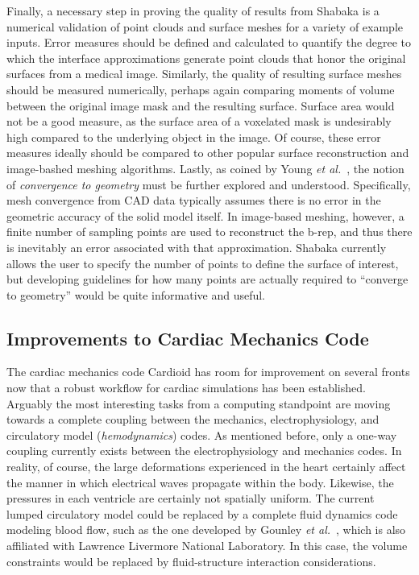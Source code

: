 Finally, a necessary step in proving the quality of results from Shabaka is a numerical validation of point clouds and surface meshes for a variety of example inputs. Error measures should be defined and calculated to quantify the degree to which the interface approximations generate point clouds that honor the original surfaces from a medical image. Similarly, the quality of resulting surface meshes should be measured numerically, perhaps again comparing moments of volume between the original image mask and the resulting surface. Surface area would not be a good measure, as the surface area of a voxelated mask is undesirably high compared to the underlying object in the image. Of course, these error measures ideally should be compared to other popular surface reconstruction and image-bashed meshing algorithms. Lastly, as coined by Young \textit{et al.}~\cite{young_2008}, the notion of \textit{convergence to geometry} must be further explored and understood. Specifically, mesh convergence from CAD data typically assumes there is no error in the geometric accuracy of the solid model itself. In image-based meshing, however, a finite number of sampling points are used to reconstruct the b-rep, and thus there is inevitably an error associated with that approximation. Shabaka currently allows the user to specify the number of points to define the surface of interest, but developing guidelines for how many points are actually required to ``converge to geometry'' would be quite informative and useful.

\subsection{Improvements to Cardiac Mechanics Code}
\label{Improvements to Cardiac Mechanics Code}

The cardiac mechanics code Cardioid has room for improvement on several fronts now that a robust workflow for cardiac simulations has been established. Arguably the most interesting tasks from a computing standpoint are moving towards a complete coupling between the mechanics, electrophysiology, and circulatory model (\textit{hemodynamics}) codes. As mentioned before, only a one-way coupling currently exists between the electrophysiology and mechanics codes. In reality, of course, the large deformations experienced in the heart certainly affect the manner in which electrical waves propagate within the body. Likewise, the pressures in each ventricle are certainly not spatially uniform. The current lumped circulatory model could be replaced by a complete fluid dynamics code modeling blood flow, such as the one developed by Gounley \textit{et al.}~\cite{gounley_2017}, which is also affiliated with Lawrence Livermore National Laboratory. In this case, the volume constraints would be replaced by fluid-structure interaction considerations.

